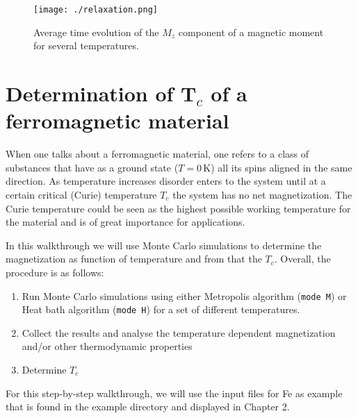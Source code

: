 \documentclass[11pt,fleqn,a4]{book} %
\begin{document}
\begin{figure}[h!]
\center
\texttt{[image: ./relaxation.png]}
\caption{Average time evolution of the $M_z$ component of a magnetic moment for several temperatures. \label{fig:relaxation}}
\end{figure}

\section{Determination of T$_c$ of a ferromagnetic material}
When one talks about a ferromagnetic material, one refers to a class of substances that have as a ground state ($T=0\,\textrm{K}$) all its spins aligned in the same direction. As temperature increases disorder enters to the system until at a certain critical (Curie) temperature $T_c$  the system has no net magnetization. The Curie temperature could be seen as the highest possible working temperature for the material and is of great importance for applications.

In this walkthrough we will use Monte Carlo simulations to determine the magnetization as function of temperature and from that the $T_c$. Overall, the procedure is as follows:

\begin{enumerate}
\item Run Monte Carlo simulations using either Metropolis algorithm (\verb;mode M;) or Heat bath algorithm (\verb;mode H;) for a set of different temperatures.
\item Collect the results and analyse the temperature dependent magnetization and/or other thermodynamic properties
\item Determine $T_c$
\end{enumerate}

For this step-by-step walkthrough, we will use the input files for Fe as example that is found in the example directory and displayed in Chapter 2. 
\end{document}
